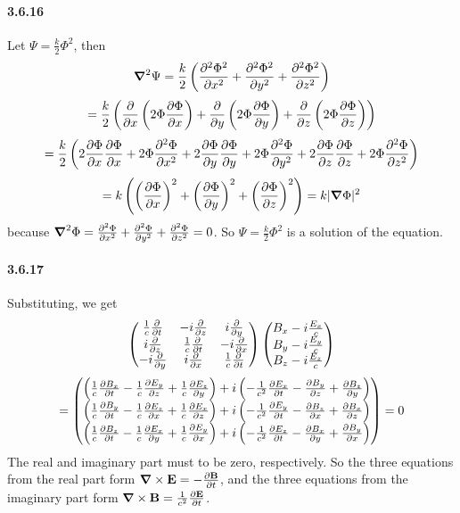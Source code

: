 \documentclass[a4paper]{article}
\begin{document}
\paragraph{3.6.16}
Let $\Psi=\frac{k}{2}\Phi^2$, then \[\del^2\Psi=\frac{k}{2}\left(\pdv{^2\Phi^2}{x^2}+\pdv{^2\Phi^2}{y^2}+\pdv{^2\Phi^2}{z^2} \right)\]
\[
=\frac{k}{2}\left(\pdv{}{x}\left(2\Phi\pdv{\Phi}{x}\right)+\pdv{}{y}\left(2\Phi\pdv{\Phi}{y}\right)+\pdv{}{z}\left(2\Phi\pdv{\Phi}{z}\right)   \right)
\]
\[=\frac{k}{2}\left(2\pdv{\Phi}{x}\pdv{\Phi}{x}+2\Phi\pdv{^2\Phi}{x^2}+2\pdv{\Phi}{y}\pdv{\Phi}{y}+2\Phi\pdv{^2\Phi}{y^2}+2\pdv{\Phi}{z}\pdv{\Phi}{z}+2\Phi\pdv{^2\Phi}{z^2}\right)\]
\[
=k\left(\left(\pdv{\Phi}{x}\right)^2+\left(\pdv{\Phi}{y}\right)^2+\left(\pdv{\Phi}{z}\right)^2 \right)
=k|\del\Phi|^2
\]
because $\del^2\Phi=\pdv{^2\Phi}{x^2}+\pdv{^2\Phi}{y^2}+\pdv{^2\Phi}{z^2}=0$. So $\Psi=\frac{k}{2}\Phi^2$ is a solution of the equation.

\paragraph{3.6.17}
Substituting, we get
\renewcommand{\arraystretch}{1.5}
\[
\begin{pmatrix}
\frac{1}{c}\pdv{}{t}&-i\pdv{}{z}&i\pdv{}{y}\\
i\pdv{}{z}&\frac{1}{c}\pdv{}{t}&-i\pdv{}{x}\\
-i\pdv{}{y}&i\pdv{}{x}&\frac{1}{c}\pdv{}{t}
\end{pmatrix}
\begin{pmatrix}
B_x-i\frac{E_x}{c}\\
B_y-i\frac{E_y}{c}\\
B_z-i\frac{E_z}{c}\\
\end{pmatrix}
\]
\[
=\begin{pmatrix}
\left(\frac{1}{c}\pdv{B_x}{t}-\frac{1}{c}\pdv{E_y}{z}+\frac{1}{c}\pdv{E_z}{y} \right)+i\left(-\frac{1}{c^2}\pdv{E_x}{t}-\pdv{B_y}{z}+\pdv{B_z}{y} \right)\\
\left(\frac{1}{c}\pdv{B_y}{t}-\frac{1}{c}\pdv{E_z}{x}+\frac{1}{c}\pdv{E_x}{z} \right)+i\left(-\frac{1}{c^2}\pdv{E_y}{t}-\pdv{B_z}{x}+\pdv{B_x}{z} \right)\\
\left(\frac{1}{c}\pdv{B_z}{t}-\frac{1}{c}\pdv{E_x}{y}+\frac{1}{c}\pdv{E_y}{x} \right)+i\left(-\frac{1}{c^2}\pdv{E_z}{t}-\pdv{B_x}{y}+\pdv{B_y}{x} \right)\\
\end{pmatrix}=0
\]
The real and imaginary part must to be zero, respectively. So the three equations from the real part form  $\del\times\V{E}=-\pdv{\V{B}}{t}$, and the three equations from the imaginary part form  $\del\times\V{B}=\frac{1}{c^2}\pdv{\V{E}}{t}$.
\end{document}
